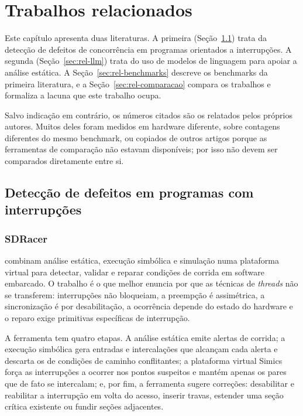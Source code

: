 \chapter{Trabalhos relacionados}
\label{cap:relacionados}


Este capítulo apresenta duas literaturas. A primeira
(Seção~\ref{sec:rel-interrupcoes}) trata da detecção de defeitos de
concorrência em programas orientados a interrupções. A segunda
(Seção~\ref{sec:rel-llm}) trata do uso de modelos de linguagem para apoiar a
análise estática. A Seção~\ref{sec:rel-benchmarks} descreve os benchmarks da primeira literatura, e a Seção~\ref{sec:rel-comparacao} compara os trabalhos e
formaliza a lacuna que este trabalho ocupa.

Salvo indicação em contrário, os números citados são os relatados pelos
próprios autores. Muitos deles foram medidos em hardware diferente, sobre
contagens diferentes do mesmo benchmark, ou copiados de outros artigos porque
as ferramentas de comparação não estavam disponíveis; por isso não devem ser
comparados diretamente entre si.

\section{Detecção de defeitos em programas com interrupções}
\label{sec:rel-interrupcoes}

\subsection{SDRacer}

 combinam análise estática, execução simbólica e simulação
numa plataforma virtual para detectar, validar e reparar condições de corrida
em software embarcado. O trabalho é o que melhor enuncia por que as técnicas de
\textit{threads} não se transferem: interrupções não bloqueiam, a preempção é
assimétrica, a sincronização é por desabilitação, a ocorrência depende do
estado do hardware e o reparo exige primitivas específicas de interrupção.

A ferramenta tem quatro etapas. A análise estática emite alertas de corrida; a
execução simbólica gera entradas e intercalações que alcançam cada alerta e
descarta os de condições de caminho conflitantes; a plataforma virtual Simics
força as interrupções a ocorrer nos pontos suspeitos e mantém apenas os pares
que de fato se intercalam; e, por fim, a ferramenta sugere correções: desabilitar e reabilitar a interrupção em volta do acesso, inserir travas, estender uma seção crítica existente ou fundir seções adjacentes.

